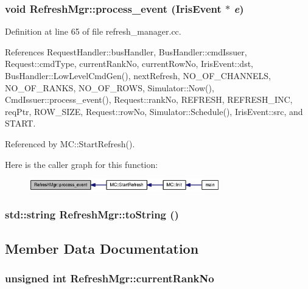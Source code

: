 \subsubsection[{process\_\-event}]{\setlength{\rightskip}{0pt plus 5cm}void RefreshMgr::process\_\-event ({\bf IrisEvent} $\ast$ {\em e})}\label{classRefreshMgr_19d89c100f78a655bd7860111755128c}




Definition at line 65 of file refresh\_\-manager.cc.

References RequestHandler::busHandler, BusHandler::cmdIssuer, Request::cmdType, currentRankNo, currentRowNo, IrisEvent::dst, BusHandler::LowLevelCmdGen(), nextRefresh, NO\_\-OF\_\-CHANNELS, NO\_\-OF\_\-RANKS, NO\_\-OF\_\-ROWS, Simulator::Now(), CmdIssuer::process\_\-event(), Request::rankNo, REFRESH, REFRESH\_\-INC, reqPtr, ROW\_\-SIZE, Request::rowNo, Simulator::Schedule(), IrisEvent::src, and START.

Referenced by MC::StartRefresh().

Here is the caller graph for this function:\nopagebreak
\begin{figure}[H]
\begin{center}
\leavevmode
\includegraphics[width=235pt]{classRefreshMgr_19d89c100f78a655bd7860111755128c_icgraph}
\end{center}
\end{figure}
\subsubsection[{toString}]{\setlength{\rightskip}{0pt plus 5cm}std::string RefreshMgr::toString ()}\label{classRefreshMgr_73f53993e11a1bac1d4c7203a61b6b81}




\subsection{Member Data Documentation}
\subsubsection[{currentRankNo}]{\setlength{\rightskip}{0pt plus 5cm}unsigned int {\bf RefreshMgr::currentRankNo}}\label{classRefreshMgr_bd56a4843e3bf40bc87192a74f51b337}




